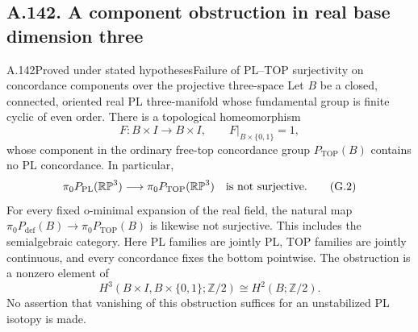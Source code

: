 \subsection{A.142. A component obstruction in real base dimension three}

\begin{saresult}{A.142}{Proved under stated hypotheses}{Failure of PL--TOP surjectivity on concordance components over the projective three-space}
Let $B$ be a closed, connected, oriented real PL three-manifold whose
fundamental group is finite cyclic of even order. There is a topological
homeomorphism
\[
 F:B\times I\longrightarrow B\times I,\qquad
 F|_{B\times\{0,1\}}=1,
                                                        \tag{G.1}
\]
whose component in the ordinary free-top concordance group
$P_{\mathrm{TOP}}(B)$ contains no PL concordance. In particular,
\[
 \pi_0P_{\mathrm{PL}}(\mathbb {RP}^3)\longrightarrow
 \pi_0P_{\mathrm{TOP}}(\mathbb {RP}^3)
 \quad\hbox{is not surjective}.                         \tag{G.2}
\]
For every fixed o-minimal expansion of the real field, the natural map
$\pi_0P_{\mathrm{def}}(B)\to\pi_0P_{\mathrm{TOP}}(B)$ is likewise
not surjective. This includes the semialgebraic category.
Here PL families are jointly PL, TOP families are jointly continuous,
and every concordance fixes the bottom pointwise. The obstruction is a
nonzero element of
\[
 H^3(B\times I,B\times\{0,1\};\mathbb Z/2)
       \cong H^2(B;\mathbb Z/2).
                                                        \tag{G.3}
\]
No assertion that vanishing of this obstruction suffices for an
unstabilized PL isotopy is made.
\end{saresult}
